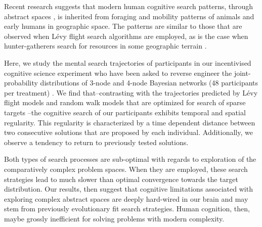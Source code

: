 Recent research \cite{baronchelli2013levy} suggests that modern human cognitive search patterns, through abstract spaces \cite{rhodes2007human,radicchi2012rationality,radicchi2012evolution}, is inherited from foraging and mobility patterns of animals \cite{viswanathan1996levy,ramos2004levy,reynolds2007displaced} and early humans \cite{gonzalez2008understanding,song2010modelling,rhee2011levy} in geographic space. The patterns are similar to those that are observed when L\'evy flight search algorithms are employed, as is the case when hunter-gatherers search for resources in some geographic terrain \cite{brown2007levy,raichlen2014evidence}. 

Here, we study the mental search trajectories of participants in our incentivised cognitive science experiment who have been asked to reverse engineer the joint-probability distributions of 3-node and 4-node Bayesian networks (48 participants per treatment) \cite{steyvers2003inferring,pearl2009causality}. We find that--contrasting with the trajectories predicted by L\'evy flight models and random walk models that are optimized for search of sparse targets \cite{viswanathan1999optimizing,edwards2007revisiting,song2010modelling,viswanathan2011physics}--the cognitive search of our participants exhibits temporal and spatial regularity. This regularity is characterized by a time dependent distance between two consecutive solutions that are proposed by each individual.  Additionally, we observe a tendency to return to previously tested solutions. 

Both types of search processes are sub-optimal with regards to exploration of the comparatively complex problem spaces. When they are employed, these search strategies lead to much slower than optimal convergence towards the target distribution. Our results, then suggest that cognitive limitations associated with exploring complex abstract spaces are deeply hard-wired in our brain and may stem from previously evolutionary fit search strategies.  Human cognition, then, maybe grossly inefficient for solving problems with modern complexity.
